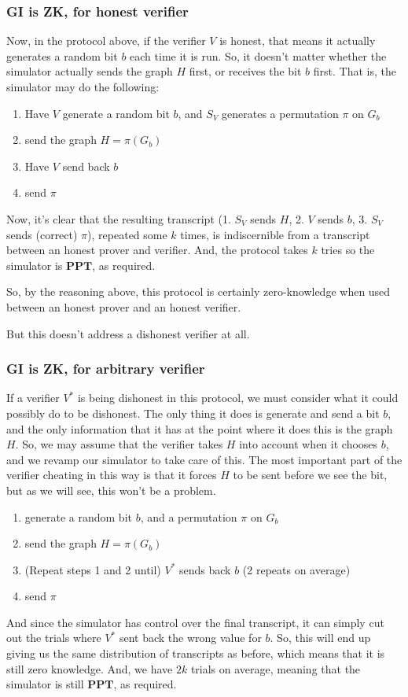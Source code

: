 \documentclass[11pt]{article}
\newcommand{\PPT}{\mathbf{PPT}}
\begin{document}
\subsubsection{GI is ZK, for honest verifier}
Now, in the protocol above, if the verifier \(V\) is honest, that means it actually generates a random bit \(b\) each time it is run. So, it doesn't matter whether the simulator actually sends the graph \(H\) first, or receives the bit \(b\) first. That is, the simulator may do the following:
\begin{enumerate}
\item Have \(V\) generate a random bit \(b\), and \(S_V\) generates a permutation \(\pi\) on \(G_b\)
\item send the graph \(H=\pi(G_b)\)
\item Have \(V\) send back \(b\)
\item send \(\pi\)
\end{enumerate}

Now, it's clear that the resulting transcript (1. \(S_V\) sends \(H\), 2. \(V\) sends \(b\), 3. \(S_V\) sends (correct) \(\pi\)), repeated some \(k\) times, is indiscernible from a transcript between an honest prover and verifier. And, the protocol takes \(k\) tries so the simulator is \(\PPT\), as required. \smallskip

So, by the reasoning above, this protocol is certainly zero-knowledge when used between an honest prover and an honest verifier.\bigskip

But this doesn't address a dishonest verifier at all.

\subsubsection{GI is ZK, for arbitrary verifier}
If a verifier \(V^*\) is being dishonest in this protocol, we must consider what it could possibly do to be dishonest. The only thing it does is generate and send a bit \(b\), and the only information that it has at the point where it does this is the graph \(H\). So, we may assume that the verifier takes \(H\) into account when it chooses \(b\), and we revamp our simulator to take care of this. The most important part of the verifier cheating in this way is that it forces \(H\) to be sent before we see the bit, but as we will see, this won't be a problem.

\begin{enumerate}
\item generate a random bit \(b\), and a permutation \(\pi\) on \(G_b\)
\item send the graph \(H=\pi(G_b)\)
\item (Repeat steps 1 and 2 until) \(V^*\) sends back \(b\) (2 repeats on average)
\item send \(\pi\)
\end{enumerate}
And since the simulator has control over the final transcript, it can simply cut out the trials where \(V^*\) sent back the wrong value for \(b\). So, this will end up giving us the same distribution of transcripts as before, which means that it is still zero knowledge. And, we have \(2k\) trials on average, meaning that the simulator is still \(\PPT\), as required.
\end{document}
